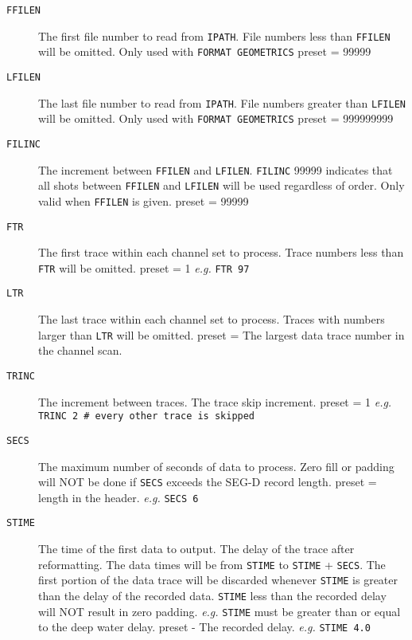 \begin{description}
\item[\texttt{FFILEN}] The first file number to read from \texttt{IPATH}.  File numbers
         less than \texttt{FFILEN} will be omitted.  Only used with
         \texttt{FORMAT GEOMETRICS}
         \Gls{preset} = 99999

\item[\texttt{LFILEN}] The last file number to read from \texttt{IPATH}.  File numbers
         greater than \texttt{LFILEN} will be omitted.  Only used with
         \texttt{FORMAT GEOMETRICS}
         \Gls{preset} = 999999999

\item[\texttt{FILINC}] The increment between \texttt{FFILEN} and \texttt{LFILEN}.  \texttt{FILINC} 99999
         indicates that all \glspl{shot} between \texttt{FFILEN} and \texttt{LFILEN} will
         be used regardless of order.  Only valid when \texttt{FFILEN} is
         given.
         \Gls{preset} = 99999

\item[\texttt{FTR}] The first trace within each channel set to process.
         Trace numbers less than \texttt{FTR} will be omitted.
         \Gls{preset} = 1     \textit{e.g.}   \texttt{FTR 97}

\item[\texttt{LTR}] The last trace within each channel set to process.  Traces
         with numbers larger than \texttt{LTR} will be omitted.
         \Gls{preset} = The largest data trace number in the channel scan.

\item[\texttt{TRINC}] The increment between traces.  The trace skip increment.
         preset = 1      \textit{e.g.}  \texttt{TRINC 2 \#  every other trace is skipped}

\item[\texttt{SECS}] The maximum number of seconds of data to process.  Zero fill
         or padding will NOT be done if \texttt{SECS} exceeds the SEG-D
         record length.
         \Gls{preset} = length in the header.     \textit{e.g.}   \texttt{SECS 6}

\item[\texttt{STIME}] The time of the first data to output.  The delay of the
         trace after reformatting.  The data times will be from \texttt{STIME}
         to \texttt{STIME} + \texttt{SECS}.  The first portion of the data trace will
         be discarded whenever \texttt{STIME} is greater than the delay of the
         recorded data.  \texttt{STIME} less than the recorded delay will NOT
         result in zero padding.  \textit{e.g.} \texttt{STIME} must be greater than or
         equal to the deep water delay.
         \Gls{preset} - The recorded delay.   \textit{e.g.} \texttt{STIME 4.0}


\end{description}

